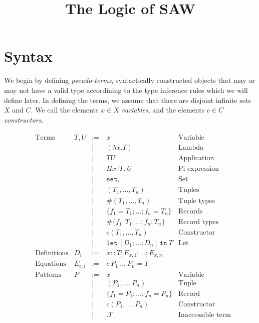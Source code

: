 \documentclass{article}
\title{The Logic of SAW}
\newcommand{\fn}[1]{\mathtt{#1}}
\newcommand{\set}[1]{\fn{set}_{#1}}
\newcommand{\Piexpr}[3]{\Pi {#1}{:}{#2}.\ {#3}}
\newcommand{\letexpr}[2]{\fn{let}\ {#1}\ \fn{in}\ {#2}}
\begin{document}

\section{Syntax}

We begin by defining \emph{pseudo-terms}, syntactically constructed objects that
may or may not have a valid type accordining to the type inference rules which we
will define later.  In defining the terms, we assume that there are disjoint infinite
sets $X$ and $C$.  We call the elements $x \in X$ \emph{variables}, and the elements
$c \in C$ \emph{constructors}.

\begin{align*}
&\begin{array}{llrll}
\text{Terms}
& T,U    &:=\:& x & \text{Variable}\\
&        & |\:& (\lambda x . T) &\text{Lambda}\\
&        & |\:& T U &\text{Application}\\
&        & |\:& \Piexpr{x}{T}{U} &\text{Pi expression}\\
&        & |\:& \set{i} & \text{Set}\\
&        & |\:& (T_1, \dots, T_n)   & \text{Tuples}\\
&        & |\:& \#(T_1, \dots, T_n)                 & \text{Tuple types}\\
&        & |\:& \{ f_1 = T_1; \dots; f_n = T_n \}   & \text{Records}\\
&        & |\:& \#\{ f_1 : T_1; \dots; f_n : T_n \} & \text{Record types}\\
&        & |\:& c(T_1,\dots,T_n)                    & \text{Constructor}\\
&        & |\:& \letexpr{[ D_1; \dots; D_n ]}{T}    & \text{Let}\\
\text{Definitions}
&D_i     &:=\:&x :: T; E_{x,1}; \dots; E_{x,n}\\
\text{Equations}
&E_{c,i} &:=\:&c\ P_1\ \dots\ P_n = T\\
\text{Patterns}
&P       &:=\:&x & \text{Variable}\\
&        & |\:&(P_1, \dots, P_n) &\text{Tuple}\\ %
&        & |\:&\{ f_1 = P_1; \dots; f_n = P_n \} & \text{Record}\\ %
&        & |\:&c(P_1, \dots, P_n) & \text{Constructor}\\ %
&        & |\:&.T & \text{Inaccessible term}\\
\end{array}\\
\end{align*}
\end{document}
